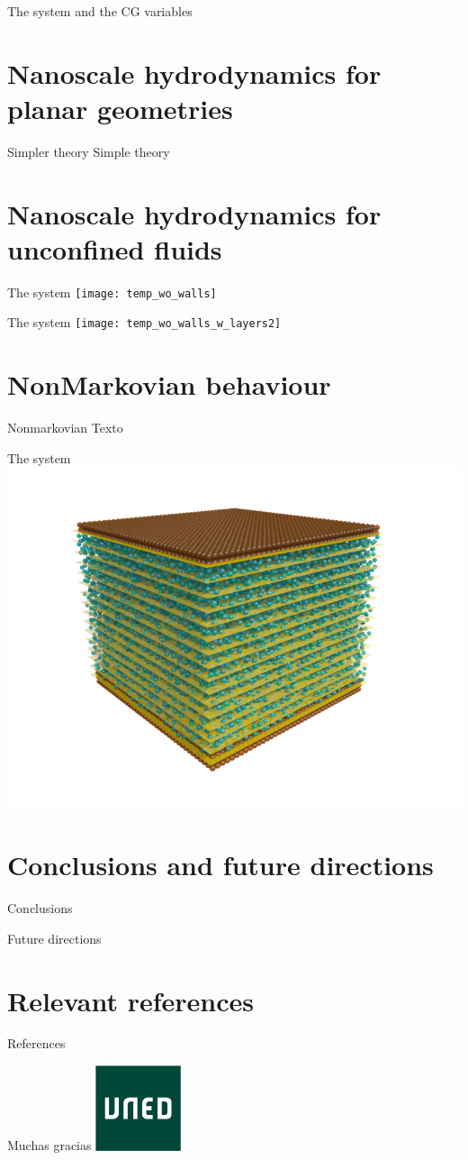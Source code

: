 \documentclass{beamer}
\begin{document}
\begin{frame}{The system and the CG variables}
\end{frame}

\section{Nanoscale hydrodynamics for planar geometries}
\begin{frame}{Simpler theory}
  Simple theory
\end{frame}

\section{Nanoscale hydrodynamics for unconfined fluids}
\begin{frame}{The system}
  \texttt{[image: temp\_wo\_walls]}
\end{frame}
\begin{frame}{The system}
  \texttt{[image: temp\_wo\_walls\_w\_layers2]}
\end{frame}

\section{NonMarkovian behaviour}
\begin{frame}{Nonmarkovian}
Texto
\end{frame}
\begin{frame}{The system}
  \includegraphics[width=.5\linewidth]{PRL3_gold2_wo_diffuse}
\end{frame}

\section{Conclusions and future directions}
\begin{frame}{Conclusions}
\end{frame}
\begin{frame}{Future directions}
\end{frame}

\section{Relevant references}
\begin{frame}{References}
\end{frame}
\begin{frame}{}
  \centering
  Muchas gracias
  \includegraphics[width=2.5cm]{logo}
\end{frame}
\end{document}

